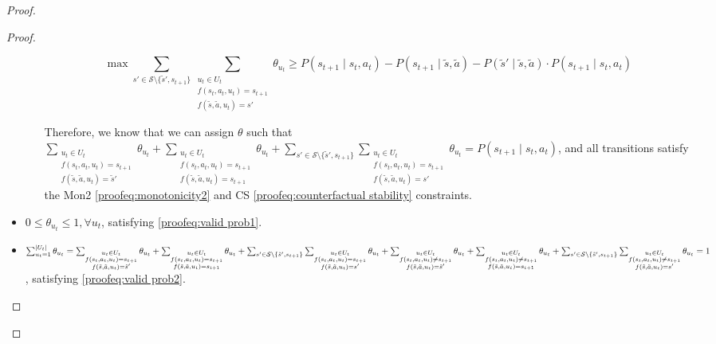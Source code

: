 \begin{proof}
\begin{proof}
\begin{itemize}
\begin{itemize}
        \[\max \sum_{s' \in \mathcal{S}\setminus \{\tilde{s}', s_{t+1}\}}\sum_{\substack{u_t \in U_t\\f(s_t, a_t, u_t) = s_{t+1} \\ f(\tilde{s}, \tilde{a}, u_t) = s'}}{\theta_{u_t}} \geq P(s_{t+1} \mid s_t, a_t) - P(s_{t+1} \mid \tilde{s}, \tilde{a}) -  P(\tilde{s}' \mid \tilde{s}, \tilde{a}) \cdot P(s_{t+1} \mid s_t, a_t)\]

        Therefore, we know that we can assign $\theta$ such that $\sum_{\substack{u_t \in U_t \\f(s_t, a_t, u_t) = s_{t+1} \\ f(\tilde{s}, \tilde{a}, u_t) = \tilde{s}'}}{\theta_{u_t}} + \sum_{\substack{u_t \in U_t \\f(s_t, a_t, u_t) = s_{t+1} \\ f(\tilde{s}, \tilde{a}, u_t) = s_{t+1}}}{\theta_{u_t}} + \sum_{s' \in \mathcal{S}\setminus\{\tilde{s}', s_{t+1}\}}\sum_{\substack{u_t \in U_t \\f(s_t, a_t, u_t) = s_{t+1} \\ f(\tilde{s}, \tilde{a}, u_t) = s'}}{\theta_{u_t}} = P(s_{t+1} \mid s_t, a_t)$, and all transitions satisfy the Mon2 \eqref{proofeq:monotonicity2} and CS \eqref{proofeq:counterfactual stability} constraints.

    \end{itemize}
    
    \item $0 \leq \theta_{u_t} \leq 1, \forall u_t$, satisfying \eqref{proofeq:valid prob1}.
    
    \item $\sum_{u_t = 1}^{|U_t|} \theta_{u_t} = \sum_{\substack{u_t \in U_t \\f(s_t, a_t, u_t) = s_{t+1} \\ f(\tilde{s}, \tilde{a}, u_t) = \tilde{s}'}} \theta_{u_t} + \sum_{\substack{u_t \in U_t \\f(s_t, a_t, u_t) = s_{t+1} \\ f(\tilde{s}, \tilde{a}, u_t) = s_{t+1}}} \theta_{u_t} +  \sum_{s' \in \mathcal{S}\setminus\{\tilde{s}', s_{t+1}\}}\sum_{\substack{u_t \in U_t \\f(s_t, a_t, u_t) = s_{t+1} \\ f(\tilde{s}, \tilde{a}, u_t) = s'}}{\theta_{u_t}} \\+ \sum_{\substack{u_t \in U_t \\f(s_t, a_t, u_t) \neq s_{t+1} \\ f(\tilde{s}, \tilde{a}, u_t) = \tilde{s}'}} \theta_{u_t} + \sum_{\substack{u_t \in U_t \\f(s_t, a_t, u_t) \neq s_{t+1} \\ f(\tilde{s}, \tilde{a}, u_t) = s_{t+1}}} \theta_{u_t} + \sum_{s' \in \mathcal{S}\setminus\{\tilde{s}', s_{t+1}\}}\sum_{\substack{u_t \in U_t \\f(s_t, a_t, u_t) \neq s_{t+1} \\ f(\tilde{s}, \tilde{a}, u_t) = s'}}{\theta_{u_t}} = 1$, satisfying \eqref{proofeq:valid prob2}.
\end{itemize}


\end{proof}
\end{proof}
